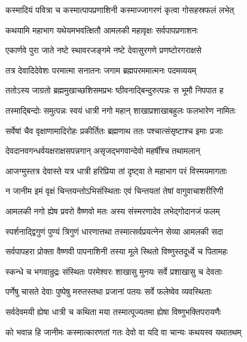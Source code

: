 \twolineshloka
{कस्मादियं पवित्रा च कस्मात्पापप्रणाशिनी}
{कस्माज्जागरणं कृत्वा गोसहस्रफलं लभेत्}%


\twolineshloka
{कथयामि महाभाग यथेयमभवत्क्षितौ}
{आमलकी महावृक्षः सर्वपापप्रणाशनः}%

\twolineshloka
{एकार्णवे पुरा जाते नष्टे स्थावरजङ्गमे}
{नष्टे देवासुरगणे प्रणष्टोरगराक्षसे}%

\twolineshloka
{तत्र देवादिदेवेशः परमात्मा सनातनः}
{जगाम ब्रह्मपरममात्मनः पदमव्ययम्}%

\twolineshloka
{ततोऽस्य जाग्रतो ब्रह्ममुखाच्छशिसमप्रभः}
{ष्ठीवनाद्बिन्दुरुत्पन्नः स भूमौ निपपात ह}%

\twolineshloka
{तस्माद्बिन्दोः समुत्पन्नः स्वयं धात्री नगो महान्}
{शाखाप्रशाखाबहुलः फलभारेण नामितः}%

\twolineshloka
{सर्वेषां चैव वृक्षाणामादिरोहः प्रकीर्तितः}
{ब्रह्मणाथ ततः पश्चात्संसृष्टाश्च इमाः प्रजाः}%

\twolineshloka
{देवदानवगन्धर्वयक्षराक्षसपन्नगान्}
{असृजद्भगवान्देवो महर्षींश्च तथामलान्}%

\twolineshloka
{आजग्मुस्तत्र देवास्ते यत्र धात्री हरिप्रिया}
{तां दृष्ट्वा ते महाभाग परं विस्मयमागताः}%

\twolineshloka
{न जानीम इमं वृक्षं चिन्तयन्तोऽभिसंस्थिताः}
{एवं चिन्तयतां तेषां वागुवाचाशरीरिणी}%

\twolineshloka
{आमलकी नगो ह्येष प्रवरो वैष्णवो मतः}
{अस्य संस्मरणादेव लभेद्गोदानजं फलम्}%

\twolineshloka
{स्पर्शनाद्द्विगुणं पुण्यं त्रिगुणं धारणात्तथा}
{तस्मात्सर्वप्रयत्नेन सेव्या आमलकी सदा}%

\twolineshloka
{सर्वपापहरा प्रोक्ता वैष्णवी पापनाशिनी}
{तस्या मूले स्थितो विष्णुस्तदूर्ध्वे च पितामहः}%

\twolineshloka
{स्कन्धे च भगवान्रुद्रः संस्थितः परमेश्वरः}
{शाखासु मुनयः सर्वे प्रशाखासु च देवताः}%

\twolineshloka
{पर्णेषु चासते देवाः पुष्पेषु मरुतस्तथा}
{प्रजानां पतयः सर्वे फलेष्वेव व्यवस्थिताः}%

\twolineshloka
{सर्वदेवमयी ह्येषा धात्री च कथिता मया}
{तस्मात्पूज्यतमा ह्येषा विष्णुभक्तिपरायणैः}%


\twolineshloka
{को भवान्न हि जानीमः कस्मात्कारणतां गतः}
{देवो वा यदि वा चान्यः कथयस्व यथातथम्}%


